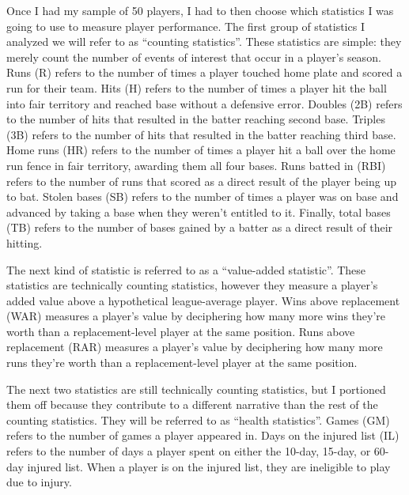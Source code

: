 \documentclass[10pt]{article}
\begin{document}
Once I had my sample of 50 players, I had to then choose which statistics I was going to use to measure player performance. 
The first group of statistics I analyzed we will refer to as “counting statistics”. These statistics are simple: they merely 
count the number of events of interest that occur in a player’s season. Runs (R) refers to the number of times a player touched 
home plate and scored a run for their team. Hits (H) refers to the number of times a player hit the ball into fair territory 
and reached base without a defensive error. Doubles (2B) refers to the number of hits that resulted in the batter reaching 
second base. Triples (3B) refers to the number of hits that resulted in the batter reaching third base. Home runs (HR) refers 
to the number of times a player hit a ball over the home run fence in fair territory, awarding them all four bases. Runs batted 
in (RBI) refers to the number of runs that scored as a direct result of the player being up to bat. Stolen bases (SB) refers 
to the number of times a player was on base and advanced by taking a base when they weren’t entitled to it. Finally, total 
bases (TB) refers to the number of bases gained by a batter as a direct result of their hitting.

The next kind of statistic is referred to as a “value-added statistic”. These statistics are technically counting statistics, 
however they measure a player’s added value above a hypothetical league-average player. Wins above replacement (WAR) measures 
a player's value by deciphering how many more wins they’re worth than a replacement-level player at the same position. Runs 
above replacement (RAR) measures a player’s value by deciphering how many more runs they’re worth than a replacement-level 
player at the same position.

The next two statistics are still technically counting statistics, but I portioned them off because they contribute to a 
different narrative than the rest of the counting statistics. They will be referred to as “health statistics”. Games (GM) 
refers to the number of games a player appeared in. Days on the injured list (IL) refers to the number of days a player spent 
on either the 10-day, 15-day, or 60-day injured list. When a player is on the injured list, they are ineligible to play due to 
injury.
\end{document}
